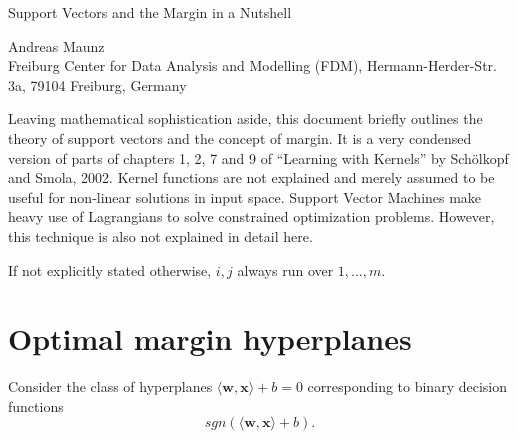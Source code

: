 \documentclass[a4paper,10pt]{article}
\begin{document}
\begin{center}
\begin{huge}Support Vectors and the Margin in a Nutshell\end{huge}

Andreas Maunz \\Freiburg Center for Data Analysis and Modelling (FDM), Hermann-Herder-Str. 3a, 79104 Freiburg, Germany
\end{center}

\begin{small}
Leaving mathematical sophistication aside, this document briefly outlines the theory of support vectors and the concept of margin. It is a very condensed version of parts of chapters 1, 2, 7 and 9 of ``Learning with Kernels'' by Sch\"olkopf and Smola, 2002.
Kernel functions are not explained and merely assumed to be useful for non-linear solutions in input space. Support Vector Machines make heavy use of Lagrangians to solve constrained optimization problems. However, this technique is also not explained in detail here.

If not explicitly stated otherwise, $i,j$ always run over $1,\ldots,m$. 
\end{small}

\section{Optimal margin hyperplanes}
Consider the class of hyperplanes $\langle \mathbf{w},\mathbf{x} \rangle + b = 0$ corresponding to binary decision functions 
\begin{equation}
 \label{dec-f}
 sgn(\langle \mathbf{w},\mathbf{x} \rangle +b).
\end{equation} 
\end{document}
